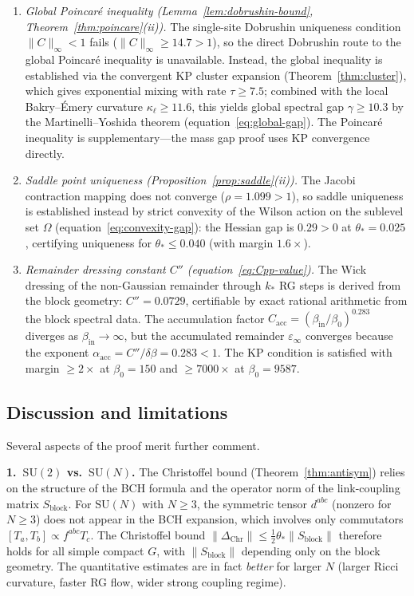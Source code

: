 \documentclass[11pt]{article}
\theoremstyle{definition}
\newcommand{\SU}{\mathrm{SU}}
\begin{document}
\begin{enumerate}[label=(\roman*)]
\item \emph{Global Poincar\'e inequality
(Lemma~\ref{lem:dobrushin-bound},
Theorem~\ref{thm:poincare}(ii)).}
The single-site Dobrushin uniqueness condition $\|C\|_\infty<1$
fails ($\|C\|_\infty\ge 14.7>1$), so the direct
Dobrushin route to the global Poincar\'e inequality
is unavailable.  Instead, the global inequality is
established via the convergent KP cluster expansion
(Theorem~\ref{thm:cluster}), which gives exponential
mixing with rate $\tau\ge 7.5$; combined
with the local Bakry--\'Emery curvature
$\kappa_\ell\ge 11.6$, this yields global spectral gap
$\gamma\ge 10.3$ by the Martinelli--Yoshida theorem
(equation~\eqref{eq:global-gap}).
The Poincar\'e inequality is supplementary---the mass gap
proof uses KP convergence directly.

\item \emph{Saddle point uniqueness
(Proposition~\ref{prop:saddle}(ii)).}
The Jacobi contraction mapping does not converge
($\rho=1.099>1$), so saddle uniqueness is established
instead by strict convexity of the Wilson action
on the sublevel set $\Omega$
(equation~\eqref{eq:convexity-gap}): the Hessian gap is $0.29>0$
at $\theta_*=0.025$, certifying uniqueness for
$\theta_*\le 0.040$ (with margin $1.6\times$).

\item \emph{Remainder dressing constant $C''$
(equation~\eqref{eq:Cpp-value}).}
The Wick dressing of the non-Gaussian remainder
through $k_*$ RG steps is derived from the
block geometry: $C''=0.0729$, certifiable by
exact rational arithmetic from the block spectral data.
The accumulation factor
$C_{\mathrm{acc}}=(\beta_{\mathrm{in}}/\beta_0)^{0.283}$
diverges as $\beta_{\mathrm{in}}\to\infty$, but the accumulated
remainder $\varepsilon_\infty$ converges
because the exponent $\alpha_{\mathrm{acc}}
=C''/\delta\beta=0.283<1$.
The KP condition is satisfied with margin $\ge 2\times$
at $\beta_0=150$ and $\ge 7000\times$ at $\beta_0=9587$.
\end{enumerate}

\subsection{Discussion and limitations}

Several aspects of the proof merit further comment.

\medskip\noindent\textbf{1.~$\SU(2)$ vs.\ $\SU(N)$.}
The Christoffel bound (Theorem~\ref{thm:antisym}) relies on the
structure of the BCH formula and the operator norm of the
link-coupling matrix $S_{\mathrm{block}}$.  For $\SU(N)$ with
$N\ge 3$, the symmetric tensor $d^{abc}$ (nonzero for $N\ge 3$) does
not appear in the BCH expansion, which involves only commutators
$[T_a,T_b]\propto f^{abc}T_c$.  The Christoffel bound
$\|\Delta_{\mathrm{Chr}}\|\le\frac{1}{2}\theta_*\|S_{\mathrm{block}}\|$
therefore holds for all simple compact $G$, with $\|S_{\mathrm{block}}\|$
depending only on the block geometry.  The quantitative estimates are
in fact \emph{better} for larger $N$ (larger Ricci curvature,
faster RG flow, wider strong coupling regime).
\end{document}
